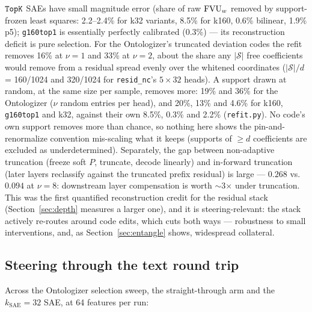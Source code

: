 $\mathop{\mathtt{TopK}}\limits$ SAEs have small magnitude error (share of raw $\mathrm{FVU}_w$ removed by
support-frozen least squares: 2.2--2.4\% for k32 variants, 8.5\% for
k160, 0.6\% bilinear, 1.9\% p5); \texttt{g160top1} is essentially
perfectly calibrated (0.3\%) --- its reconstruction deficit is pure
selection. For the Ontologizer's truncated deviation codes the refit
removes 16\% at $\nu{=}1$ and 33\% at $\nu{=}2$, about the share any
$\lvert\mathcal{S}\rvert$ free coefficients would remove from a residual
spread evenly over the whitened coordinates ($\lvert\mathcal{S}\rvert/d$
= 160/1024 and 320/1024 for \texttt{resid\_nc}'s $5\times32$ heads).
A support drawn at random, at the same size per sample, removes more:
19\% and 36\% for the Ontologizer ($\nu$ random entries per head), and
20\%, 13\% and 4.6\% for k160, \texttt{g160top1} and k32, against their
own 8.5\%, 0.3\% and 2.2\% (\texttt{refit.py}). No code's own support
removes more than chance, so nothing here shows the pin-and-renormalize
convention mis-scaling what it keeps (supports of $\geq d$ coefficients
are excluded as underdetermined). Separately, the
gap between non-adaptive truncation (freeze soft $P$, truncate, decode
linearly) and in-forward truncation (later layers reclassify against the
truncated prefix residual) is large --- $0.268$ vs.\ $0.094$ at $\nu{=}8$:
downstream layer compensation is worth $\sim$3$\times$ under truncation.
This was the first quantified reconstruction credit for the residual
stack (Section~\ref{sec:depth} measures a larger one), and it is
steering-relevant: the stack actively re-routes around code edits, which
cuts both ways --- robustness to small interventions, and, as
Section~\ref{sec:entangle} shows, widespread collateral.

\subsection{Steering through the text round trip}
\label{sec:steertext}

Across the Ontologizer selection sweep, the straight-through arm and the
$k_{\mathrm{SAE}}{=}32$ SAE, at 64 features per run:

